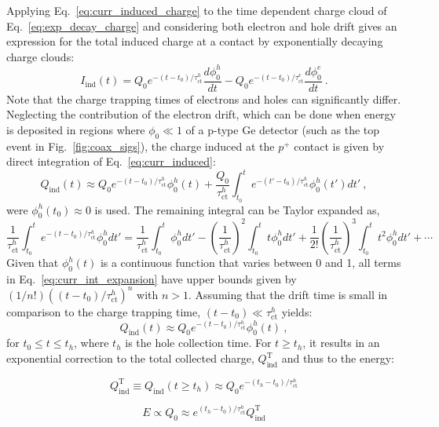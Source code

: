 Applying Eq.~\ref{eq:curr_induced_charge} to the time dependent charge cloud of Eq.~\ref{eq:exp_decay_charge} and considering both electron and hole drift gives an expression for the total induced charge at a contact by exponentially decaying charge clouds:
\begin{equation}
	I_\text{ind}(t) = Q_0e^{-(t-t_0)/\tau^h_\text{ct}}\frac{d\phi^h_0}{dt} - Q_0e^{-(t-t_0)/\tau^e_\text{ct}}\frac{d\phi^e_0}{dt}~.
	\label{eq:curr_induced}
\end{equation} 
Note that the charge trapping times of electrons and holes can significantly differ. Neglecting the contribution of the electron drift, which can be done when energy is deposited in regions where $\phi_0 \ll 1$ of a p-type Ge detector (such as the top event in Fig.~\ref{fig:coax_sigs}), the charge induced at the $p^+$ contact is given by direct integration of Eq.~\ref{eq:curr_induced}:
\begin{equation}
	Q_\text{ind}(t) \approx Q_0e^{-(t-t_0)/\tau^h_\text{ct}}\phi^h_0(t) + \frac{Q_0}{\tau^h_\text{ct}}\int_{t_0}^{t}e^{-(t'-t_0)/\tau^h_\text{ct}}\phi^h_0(t')dt'~,
\end{equation}
were $\phi^h_0(t_0) \approx 0$ is used. The remaining integral can be Taylor expanded as,
\begin{equation}
	\frac{1}{\tau^h_\text{ct}}\int_{t_0}^{t}e^{-(t-t_0)/\tau^h_\text{ct}}\phi^h_0dt' = \frac{1}{\tau^h_\text{ct}}\int_{t_0}^{t}\phi^h_0dt' - \left(\frac{1}{\tau^h_\text{ct}}\right)^2\int_{t_0}^{t}t\phi^h_0dt' + \frac{1}{2!}\left(\frac{1}{\tau^h_\text{ct}}\right)^3\int_{t_0}^{t}t^2\phi^h_0dt' + \cdots
	\label{eq:curr_int_expansion}
\end{equation} 
Given that $\phi^h_0(t)$ is a continuous function that varies between 0 and 1, all terms in Eq.~\ref{eq:curr_int_expansion} have upper bounds given by $(1/n!)((t-t_0)/\tau^h_\text{ct})^n$ with $n>1$. Assuming that the drift time is small in comparison to the charge trapping time, $(t-t_0)\ll\tau^h_\text{ct}$ yields:
\begin{equation}
	Q_\text{ind}(t) \approx Q_0e^{-(t-t_0)/\tau^h_\text{ct}}\phi^h_0(t)~,
	\label{eq:exp_decay_charge_ind}
\end{equation}
for $t_0 \le t \le t_h$, where $t_h$ is the hole collection time. For $t \ge t_h$, it results in an exponential correction to the total collected charge, $Q^\text{T}_\text{ind}$ and thus to the energy:
\vspace{-1.5\baselineskip}
\begin{multicols}{2}
	\begin{equation}
		Q^\text{T}_\text{ind} \equiv Q_\text{ind}(t \ge t_h) \approx Q_0e^{-(t_h-t_0)/\tau^h_\text{ct}}
		\label{eq:charge_ind_corr}
	\end{equation}

	\begin{equation}
		E \propto Q_0 \approx e^{(t_h-t_0)/\tau^h_\text{ct}}Q^\text{T}_\text{ind}
		\label{eq:energy_corr}
	\end{equation}
\end{multicols}
